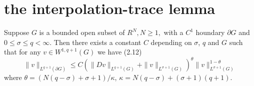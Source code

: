 \section{the interpolation-trace lemma}
\begin{lemma}
	\cite{Diaz1985}
	\label{the interpolation-trace lemma}
	Suppose $G$ is a bounded open subset of $R^{N}, N \geq 1,$ with a $C^{1}$ houndary $\partial G$ and $0 \leq \sigma \leq q<\infty .$ Then there exists a constant $C$ depending on $\sigma$, $q$ and $G$ such that for any $v \in W^{1, q+1}(G)$ we have
(2.12)
\begin{equation*}
	\|v\|_{L^{q+1}(\partial G)} \leq C\left(\|D v\|_{L^{q+1}(G)}+\|v\|_{L^{\sigma+1}(G)}\right)^{\theta}\|v\|_{L^{\sigma+1}(G)}^{1-\theta}
\end{equation*}
where $\theta=(N(q-\sigma)+\sigma+1) / \kappa$, \(\kappa=N(q-\sigma)+(\sigma+1)(q+1)\).

\end{lemma}

